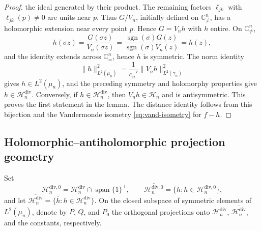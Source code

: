 \documentclass[11pt,reqno]{amsart}
\numberwithin{equation}{section}%
\numberwithin{figure}{section}%
\numberwithin{table}{section}
\theoremstyle{plain}
\theoremstyle{definition}
\begin{document}
\begin{proof}
  the ideal generated by their product. The remaining factors $\ell_{jk}$ with
  $\ell_{jk}(p)\ne0$ are units near $p$. Thus $G/V_n$, initially defined on
  $\mathbb{C}^n_{\neq}$, has a holomorphic extension near every point $p$.
  Hence $G=V_n h$ with $h$ entire. On $\mathbb{C}^n_{\neq}$,
  \[
    h(\sigma z)=\frac{G(\sigma z)}{V_n(\sigma z)}
    =\frac{\operatorname{sgn}(\sigma)G(z)}{\operatorname{sgn}(\sigma)V_n(z)}=h(z),
  \]
  and the identity extends across \(\mathbb{C}^n_{=}\), hence \(h\) is
  symmetric. The norm identity
  \[
    \|h\|_{L^2(\mu_n)}^2=\frac{1}{c_n'}\|V_nh\|_{L^2(\gamma_n)}^2
  \]
  gives $h\in L^2(\mu_n)$, and the preceding symmetry and holomorphy
  properties give $h\in\mathcal{H}_n^{\mathrm{div}}$. Conversely, if
  $h\in\mathcal{H}_n^{\mathrm{div}}$, then $V_nh\in\mathcal{H}_n$ and is
  antisymmetric. This proves the first statement in the lemma. The distance
  identity follows from this bijection and the Vandermonde isometry
  \eqref{eq:vand-isometry} for $f-h$.
\end{proof}

\subsection{Holomorphic--antiholomorphic projection geometry}

Set
\[
  \mathcal{H}_n^{\mathrm{div},0}
  =\mathcal{H}_n^{\mathrm{div}}\cap\operatorname{span}\{1\}^{\perp},
  \qquad
  \overline{\mathcal{H}_n^{\mathrm{div},0}}
  =\{\overline h:h\in\mathcal{H}_n^{\mathrm{div},0}\},
\]
and let
$\overline{\mathcal{H}_n^{\mathrm{div}}}
=\{\overline h:h\in\mathcal{H}_n^{\mathrm{div}}\}$.
On the closed subspace of symmetric elements of $L^2(\mu_n)$, denote by
$P$, $Q$, and $P_0$ the orthogonal projections onto
$\mathcal{H}_n^{\mathrm{div}}$,
$\overline{\mathcal{H}_n^{\mathrm{div}}}$, and the constants, respectively.
\end{document}
